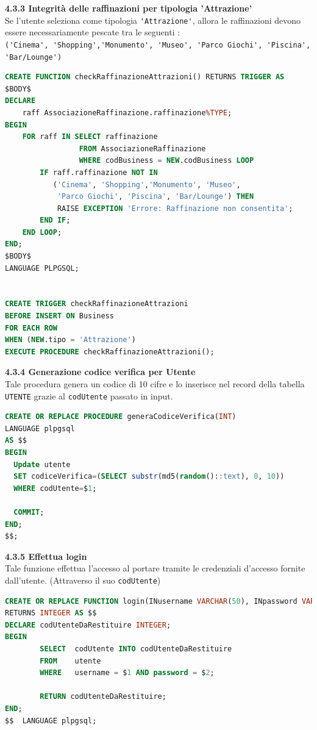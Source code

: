 \documentclass[a4paper,12pt]{article}
\begin{document}
{\flushleft \bf 4.3.3 Integrità delle raffinazioni per tipologia 'Attrazione'}\\
\normalsize{Se l'utente seleziona come tipologia \verb|'Attrazione'|, allora le raffinazioni
devono essere necessariamente pescate tra le seguenti : \\
\verb|('Cinema', 'Shopping','Monumento', 'Museo', 'Parco Giochi', 'Piscina',|\\
\verb|'Bar/Lounge')|}
\begin{lstlisting}[language=SQL]
CREATE FUNCTION checkRaffinazioneAttrazioni() RETURNS TRIGGER AS
$BODY$
DECLARE
	raff AssociazioneRaffinazione.raffinazione%TYPE;
BEGIN
	FOR raff IN SELECT raffinazione 
			     FROM AssociazioneRaffinazione 
			     WHERE codBusiness = NEW.codBusiness LOOP
		IF raff.raffinazione NOT IN 
		   ('Cinema', 'Shopping','Monumento', 'Museo', 
		    'Parco Giochi', 'Piscina', 'Bar/Lounge') THEN
			RAISE EXCEPTION 'Errore: Raffinazione non consentita';
		END IF;
	END LOOP;
END;
$BODY$
LANGUAGE PLPGSQL;


CREATE TRIGGER checkRaffinazioneAttrazioni
BEFORE INSERT ON Business
FOR EACH ROW
WHEN (NEW.tipo = 'Attrazione')
EXECUTE PROCEDURE checkRaffinazioneAttrazioni();
\end{lstlisting}
\newpage

\newpage\null{}\setcounter{page}{20}
\vspace{-2cm}
{\flushleft \bf 4.3.4  Generazione codice verifica per Utente}\\
Tale procedura genera un codice di 10 cifre e lo inserisce nel record della tabella
\verb|UTENTE| grazie al \verb|codUtente| passato in input.
\begin{lstlisting}[language=SQL]
CREATE OR REPLACE PROCEDURE generaCodiceVerifica(INT)
LANGUAGE plpgsql
AS $$
BEGIN
  Update utente
  SET codiceVerifica=(SELECT substr(md5(random()::text), 0, 10))
  WHERE codUtente=$1;

  COMMIT;
END;
$$;
\end{lstlisting}

\vspace*{+1cm}

{\flushleft \bf 4.3.5  Effettua login}\\
Tale funzione effettua l'accesso al portare tramite le credenziali d'accesso fornite
dall'utente. (Attraverso il suo \verb|codUtente|)
\begin{lstlisting}[language=SQL]
CREATE OR REPLACE FUNCTION login(INusername VARCHAR(50), INpassword VARCHAR(100))
RETURNS INTEGER AS $$
DECLARE codUtenteDaRestituire INTEGER;
BEGIN
        SELECT  codUtente INTO codUtenteDaRestituire
        FROM    utente
        WHERE   username = $1 AND password = $2;

        RETURN codUtenteDaRestituire;
END;
$$  LANGUAGE plpgsql;
\end{lstlisting}
\end{document}
